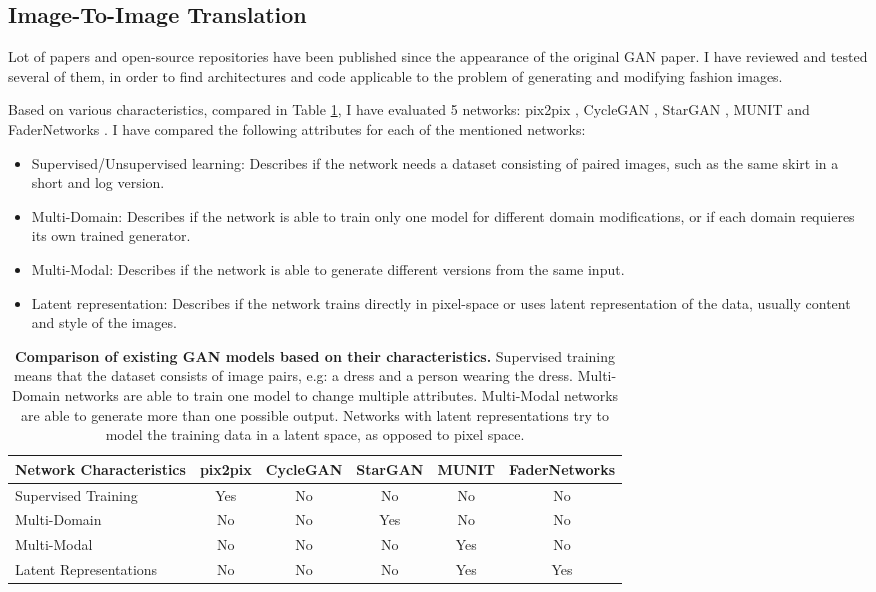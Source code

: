 \documentclass{article}
\begin{document}
\subsection{Image-To-Image Translation}

Lot of papers and open-source repositories have been published since the appearance of the original GAN paper. I have reviewed and tested several of them, in order to find architectures and code applicable to the problem of generating and modifying fashion images. 

Based on various characteristics, compared in Table \ref{tab:gan_comp}, I have evaluated  5 networks: pix2pix \cite{isola_image--image_2016}, CycleGAN \cite{zhu_unpaired_2017}, StarGAN \cite{choi_stargan:_2017}, MUNIT \cite{huang_multimodal_2018} and FaderNetworks \cite{lample_fader_2017}. I have compared the following attributes for each of the mentioned networks:
\begin{itemize}
\item Supervised/Unsupervised learning: Describes if the network needs a dataset consisting of paired images, such as the same skirt in a short and log version.
\item Multi-Domain: Describes if the network is able to train only one model for different domain modifications, or if each domain requieres its own trained generator.
\item Multi-Modal: Describes if the network is able to generate different versions from the same input.
\item Latent representation: Describes if the network trains directly in pixel-space or uses latent representation of the data, usually content and style of the images.
\end{itemize}

\begin{table}
\centering
\begin{tabular}{l*{5}{c}}
Network Characteristics & pix2pix &	CycleGAN & StarGAN	& MUNIT	& FaderNetworks \\
\hline
Supervised Training		& Yes & No & No & No & No \\
Multi-Domain  			& No  & No & Yes & No & No \\
Multi-Modal				& No & No & No & Yes & No \\
Latent Representations	& No & No & No & Yes & Yes \\
\end{tabular}
\caption{\label{tab:gan_comp}\textbf{Comparison of existing GAN models based on their characteristics.} Supervised training means that the dataset consists of image pairs, e.g: a dress and a person wearing the dress. Multi-Domain networks are able to train one model to change multiple attributes. Multi-Modal networks are able to generate more than one possible output. Networks with latent representations try to model the training data in a latent space, as opposed to pixel space.}
\end{table}
\end{document}
